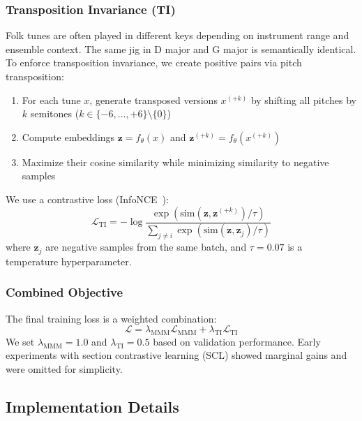 \documentclass[]{interact}
\theoremstyle{plain}
\theoremstyle{definition}
\theoremstyle{remark}
\begin{document}
\subsubsection{Transposition Invariance (TI)}

Folk tunes are often played in different keys depending on instrument range and ensemble context. The same jig in D major and G major is semantically identical. To enforce transposition invariance, we create positive pairs via pitch transposition:
\begin{enumerate}
\item For each tune $x$, generate transposed versions $x^{(+k)}$ by shifting all pitches by $k$ semitones ($k \in \{-6, \ldots, +6\} \setminus \{0\}$)
\item Compute embeddings $\mathbf{z} = f_\theta(x)$ and $\mathbf{z}^{(+k)} = f_\theta(x^{(+k)})$
\item Maximize their cosine similarity while minimizing similarity to negative samples
\end{enumerate}

We use a contrastive loss (InfoNCE~\cite{SimCLR2020}):
\begin{equation}
\mathcal{L}_{\text{TI}} = -\log \frac{\exp(\text{sim}(\mathbf{z}, \mathbf{z}^{(+k)}) / \tau)}{\sum_{j \neq i} \exp(\text{sim}(\mathbf{z}, \mathbf{z}_j) / \tau)}
\end{equation}
where $\mathbf{z}_j$ are negative samples from the same batch, and $\tau = 0.07$ is a temperature hyperparameter.

\subsubsection{Combined Objective}

The final training loss is a weighted combination:
\begin{equation}
\mathcal{L} = \lambda_{\text{MMM}} \mathcal{L}_{\text{MMM}} + \lambda_{\text{TI}} \mathcal{L}_{\text{TI}}
\end{equation}
We set $\lambda_{\text{MMM}} = 1.0$ and $\lambda_{\text{TI}} = 0.5$ based on validation performance. Early experiments with section contrastive learning (SCL) showed marginal gains and were omitted for simplicity.

\subsection{Implementation Details}
\end{document}
